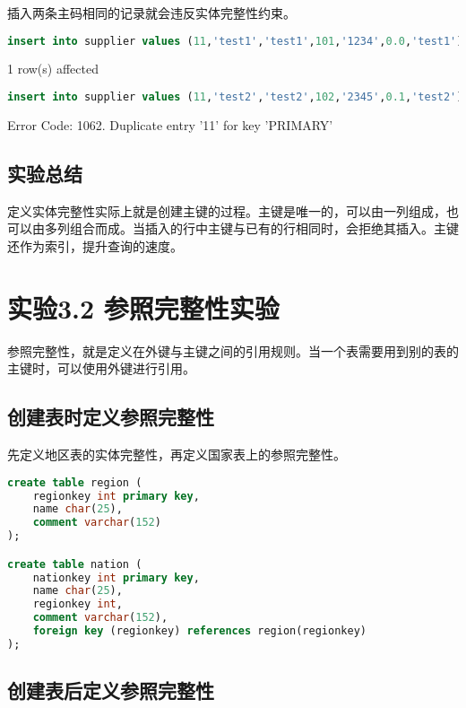 \documentclass{article}
\begin{document}
插入两条主码相同的记录就会违反实体完整性约束。

\begin{lstlisting}[language=sql]
insert into supplier values (11,'test1','test1',101,'1234',0.0,'test1');
\end{lstlisting}

1 row(s) affected

\begin{lstlisting}[language=sql]
insert into supplier values (11,'test2','test2',102,'2345',0.1,'test2');
\end{lstlisting}

Error Code: 1062. Duplicate entry '11' for key 'PRIMARY'

\subsection{实验总结}

定义实体完整性实际上就是创建主键的过程。主键是唯一的，可以由一列组成，也可以由多列组合而成。当插入的行中主键与已有的行相同时，会拒绝其插入。主键还作为索引，提升查询的速度。

\section{实验3.2 参照完整性实验}

参照完整性，就是定义在外键与主键之间的引用规则。当一个表需要用到别的表的主键时，可以使用外键进行引用。

\subsection{创建表时定义参照完整性}

先定义地区表的实体完整性，再定义国家表上的参照完整性。

\begin{lstlisting}[language=sql]
create table region (
	regionkey int primary key,
    name char(25),
    comment varchar(152)
);

create table nation (
	nationkey int primary key,
    name char(25),
    regionkey int,
    comment varchar(152),
    foreign key (regionkey) references region(regionkey)
);
\end{lstlisting}

\subsection{创建表后定义参照完整性}
\end{document}
